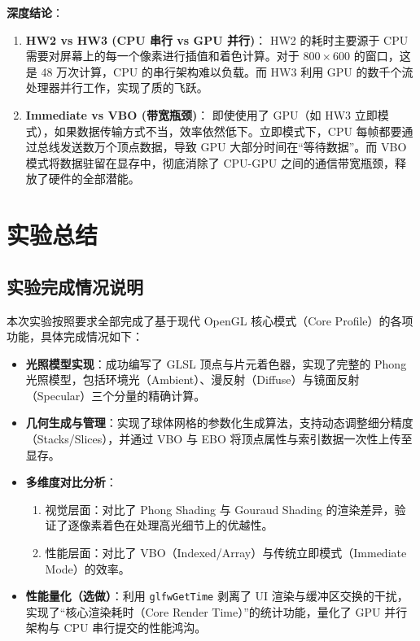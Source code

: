 \documentclass[a4paper]{article}
\begin{document}
\textbf{深度结论}：

\begin{enumerate}
    \item \textbf{HW2 vs HW3 (CPU 串行 vs GPU 并行)}：
    HW2 的耗时主要源于 CPU 需要对屏幕上的每一个像素进行插值和着色计算。对于 $800 \times 600$ 的窗口，这是 48 万次计算，CPU 的串行架构难以负载。而 HW3 利用 GPU 的数千个流处理器并行工作，实现了质的飞跃。
    
    \item \textbf{Immediate vs VBO (带宽瓶颈)}：
    即使使用了 GPU（如 HW3 立即模式），如果数据传输方式不当，效率依然低下。立即模式下，CPU 每帧都要通过总线发送数万个顶点数据，导致 GPU 大部分时间在“等待数据”。而 VBO 模式将数据驻留在显存中，彻底消除了 CPU-GPU 之间的通信带宽瓶颈，释放了硬件的全部潜能。
\end{enumerate}

\section{实验总结}
\subsection{实验完成情况说明}
本次实验按照要求全部完成了基于现代 OpenGL 核心模式（Core Profile）的各项功能，具体完成情况如下：
\begin{itemize}
    \item \textbf{光照模型实现}：成功编写了 GLSL 顶点与片元着色器，实现了完整的 Phong 光照模型，包括环境光（Ambient）、漫反射（Diffuse）与镜面反射（Specular）三个分量的精确计算。
    \item \textbf{几何生成与管理}：实现了球体网格的参数化生成算法，支持动态调整细分精度（Stacks/Slices），并通过 VBO 与 EBO 将顶点属性与索引数据一次性上传至显存。
    \item \textbf{多维度对比分析}：
    \begin{enumerate}
        \item 视觉层面：对比了 Phong Shading 与 Gouraud Shading 的渲染差异，验证了逐像素着色在处理高光细节上的优越性。
        \item 性能层面：对比了 VBO（Indexed/Array）与传统立即模式（Immediate Mode）的效率。
    \end{enumerate}
    \item \textbf{性能量化（选做）}：利用 \texttt{glfwGetTime} 剥离了 UI 渲染与缓冲区交换的干扰，实现了“核心渲染耗时（Core Render Time）”的统计功能，量化了 GPU 并行架构与 CPU 串行提交的性能鸿沟。
\end{itemize}
\end{document}
